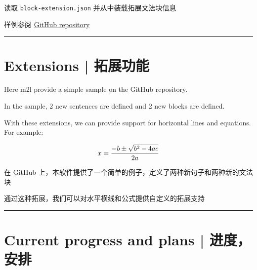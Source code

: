 \documentclass{ctexart}
\begin{document}
	读取 \texttt{block-extension.json} 并从中装载拓展文法块信息
	
	样例参阅 \href{https://github.com/TrickEye/md2latex-converter/blob/master/sentence_extension.json}{GitHub repository}
	
	\noindent\rule{\textwidth}{1pt}
	
	\section{Extensions | 拓展功能}
	
	Here m2l provide a simple sample on the GitHub repository.
	
	In the sample, 2 new sentences are defined and 2 new blocks are defined.
	
	With these extensions, we can provide support for horizontal lines and equations. For example:
	
	$$
	x ={-b \pm \sqrt{b^2-4ac}\over 2a}
	$$
	
	在 GitHub 上，本软件提供了一个简单的例子，定义了两种新句子和两种新的文法块
	
	通过这种拓展，我们可以对水平横线和公式提供自定义的拓展支持
	
	\noindent\rule{\textwidth}{1pt}
	
	\section{Current progress and plans | 进度，安排}
	
\end{document}
